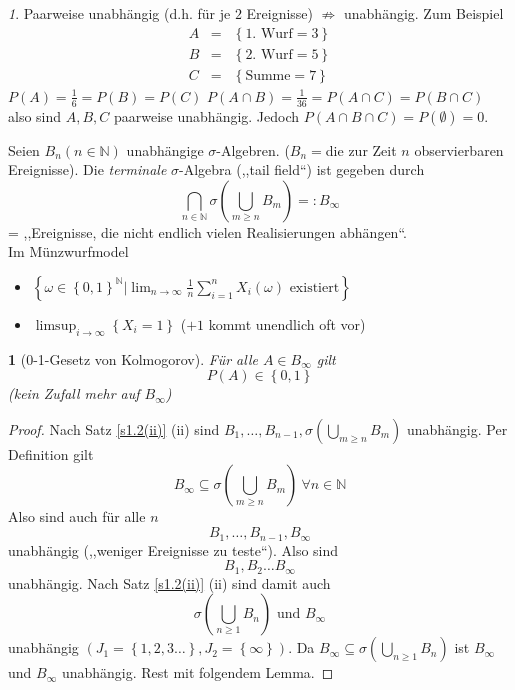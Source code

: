 \documentclass[10pt,a4paper]{report}
\numberwithin{equation}{section}
\numberwithin{figure}{section}
\theoremstyle{plain}
\theoremstyle{definition}
\theoremstyle{remark}
\newtheorem{rem}[thm]{\protect\remarkname}
\theoremstyle{plain}
\newtheorem{prop}[thm]{\protect\propositionname}
\providecommand{\propositionname}{Satz}
\providecommand{\remarkname}{Bemerkung}
\newcommand{\1}{ \mathbb{1} } %
\begin{document}
\begin{rem}
  Paarweise unabhängig (d.h. für je $2$ Ereignisse) $\not\Rightarrow$
  unabhängig. Zum Beispiel
  \begin{eqnarray*}
    A & = & \left\{ \text{1. Wurf}=3\right\} \\
    B & = & \left\{ \text{2. Wurf}=5\right\} \\
    C & = & \left\{ \text{Summe}=7\right\} 
  \end{eqnarray*}
  $P\left(A\right)=\frac{1}{6}=P\left(B\right)=P\left(C\right)$ $P\left(A\cap B\right)=\frac{1}{36}=P\left(A\cap C\right)=P\left(B\cap C\right)$
  also sind $A,B,C$ paarweise unabhängig. Jedoch $P\left(A\cap B\cap C\right)=P\left(\emptyset\right)=0$.

  Seien $B_{n}\left(n\in\mathbb{N}\right)$ unabhängige $\sigma$-Algebren.
  ($B_{n}=$die zur Zeit $n$ observierbaren Ereignisse). Die \emph{terminale}
   $\sigma$-Algebra (,,tail field``) ist gegeben durch
  \[
  \bigcap_{n\in\mathbb{N}}\sigma\left(\bigcup_{m\geq n}B_{m}\right)=:B_{\infty}
  \]
  = ,,Ereignisse, die nicht endlich vielen Realisierungen abhängen``.\\
  Im Münzwurfmodel
  \begin{itemize}
  \item $\left\{ \omega\in\left\{ 0,1\right\} ^{\mathbb{N}}|\lim_{n\to\infty}\frac{1}{n}\sum_{i=1}^{n}X_{i}\left(\omega\right)\text{ existiert}\right\} $
  \item $\limsup_{i\to\infty}\left\{ X_{i}=1\right\} $ ($+1$ kommt unendlich
    oft vor) 
  \end{itemize}
\end{rem}
\begin{prop}[0-1-Gesetz von Kolmogorov]

  Für alle $A\in B_{\infty}$ gilt
  \[
  P\left(A\right)\in\left\{ 0,1\right\} 
  \]
  (kein Zufall mehr auf $B_{\infty}$)
\end{prop}
\begin{proof}
  Nach Satz \ref{s1.2(ii)} (ii) sind $B_{1},\ldots,B_{n-1},\sigma\left(\bigcup_{m\geq n}B_{m}\right)$
  unabhängig. Per Definition gilt
  \[
  B_{\infty}\subseteq\sigma\left(\bigcup_{m\geq n}B_{m}\right)\ \forall n\in\mathbb{N}
  \]
  Also sind auch für alle $n$
  \[
  B_{1},\ldots,B_{n-1},B_{\infty}
  \]
  unabhängig (,,weniger Ereignisse zu teste``). Also sind
  \[
  B_{1},B_{2}\ldots B_{\infty}
  \]
  unabhängig. Nach Satz \ref{s1.2(ii)} (ii) sind damit auch
  \[
  \sigma\left(\bigcup_{n\geq1}B_{n}\right)\text{ und }B_{\infty}
  \]
  unabhängig $\left(J_{1}=\left\{ 1,2,3\ldots\right\} ,J_{2}=\left\{ \infty\right\} \right)$.
  Da $B_{\infty}\subseteq\sigma\left(\bigcup_{n\geq1}B_{n}\right)$
  ist $B_{\infty}$ und $B_{\infty}$ unabhängig. Rest mit folgendem
  Lemma.
\end{proof}
\end{document}
